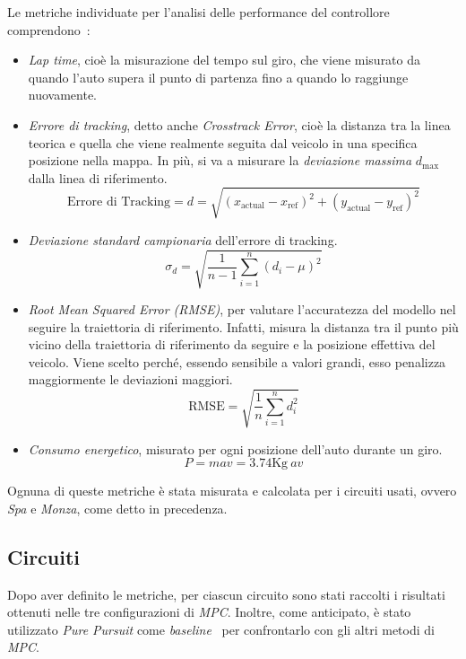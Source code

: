 Le metriche individuate per l'analisi delle performance del controllore 
comprendono~\cite{dighe2023kinematics}:
\begin{itemize}
    \item \textit{Lap time}, cioè la misurazione del tempo sul giro, che viene misurato da quando 
    l'auto supera il punto di partenza fino a quando lo raggiunge nuovamente.
    \item \textit{Errore di tracking}, detto anche \textit{Crosstrack Error}, cioè la distanza tra 
    la linea teorica e quella che viene realmente seguita dal veicolo in una specifica posizione  
    nella mappa. In più, si va a misurare la \textit{deviazione massima} \(d_\text{max}\) dalla linea di riferimento.
    \[ \text{Errore di Tracking} = d = \sqrt{(x_\text{actual} - x_\text{ref})^2 + (y_\text{actual} - y_\text{ref})^2}
    \]
    \item \textit{Deviazione standard campionaria} dell'errore di tracking.
    \[
    \sigma_d = \sqrt{\frac{1}{n-1} \sum_{i=1}^{n} (d_i - \mu)^2}
    \]
    \item \textit{Root Mean Squared Error (RMSE)}, per valutare l'accuratezza del modello nel 
    seguire la traiettoria di riferimento. Infatti, misura la distanza tra il punto più vicino 
    della traiettoria di riferimento da seguire e la posizione effettiva del veicolo. Viene scelto 
    perché, essendo sensibile a valori grandi, esso penalizza maggiormente le deviazioni maggiori.
    \[ \text{RMSE} = 
    \sqrt{\frac{1}{n} \sum_{i=1}^{n} d_i^2}
    \]
    \item \textit{Consumo energetico}, misurato per ogni posizione dell'auto durante un giro.
    \[
    P = m a v = 3.74 \text{Kg} \ a v
    \]
\end{itemize}
Ognuna di queste metriche è stata misurata e calcolata per i circuiti usati, ovvero \textit{Spa} e \textit{Monza}, come detto in precedenza.

\subsection{Circuiti}
Dopo aver definito le metriche, per ciascun circuito sono stati raccolti i risultati ottenuti 
nelle tre configurazioni di \textit{MPC}.
Inoltre, come anticipato, è stato utilizzato \textit{Pure Pursuit} come 
\textit{baseline}~\cite{becker2023model} per confrontarlo con gli altri metodi di \textit{MPC}.

